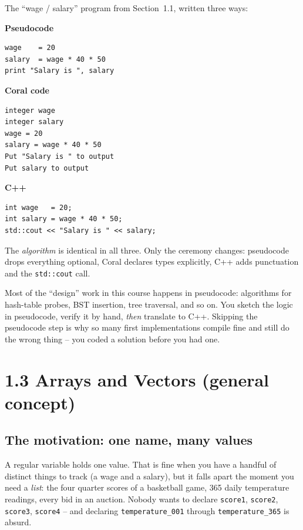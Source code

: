 \documentclass[11pt]{article}
\begin{document}
\begin{examplebox}
The ``wage / salary'' program from Section~1.1, written three ways:

\textbf{Pseudocode}
\begin{lstlisting}
wage    = 20
salary  = wage * 40 * 50
print "Salary is ", salary
\end{lstlisting}

\textbf{Coral code}
\begin{lstlisting}
integer wage
integer salary
wage = 20
salary = wage * 40 * 50
Put "Salary is " to output
Put salary to output
\end{lstlisting}

\textbf{C++}
\begin{lstlisting}
int wage   = 20;
int salary = wage * 40 * 50;
std::cout << "Salary is " << salary;
\end{lstlisting}

The \emph{algorithm} is identical in all three. Only the ceremony
changes: pseudocode drops everything optional, Coral declares types
explicitly, C++ adds punctuation and the \texttt{std::cout} call.
\end{examplebox}

\begin{ideabox}
Most of the ``design'' work in this course happens in pseudocode:
algorithms for hash-table probes, BST insertion, tree traversal, and so
on. You sketch the logic in pseudocode, verify it by hand, \emph{then}
translate to C++. Skipping the pseudocode step is why so many first
implementations compile fine and still do the wrong thing -- you coded
a solution before you had one.
\end{ideabox}

\section{1.3 Arrays and Vectors (general concept)}

\subsection{The motivation: one name, many values}

A regular variable holds one value. That is fine when you have a handful
of distinct things to track (a wage and a salary), but it falls apart
the moment you need a \emph{list}: the four quarter scores of a
basketball game, 365 daily temperature readings, every bid in an
auction. Nobody wants to declare \texttt{score1}, \texttt{score2},
\texttt{score3}, \texttt{score4} -- and declaring
\texttt{temperature\_001} through \texttt{temperature\_365} is absurd.
\end{document}

